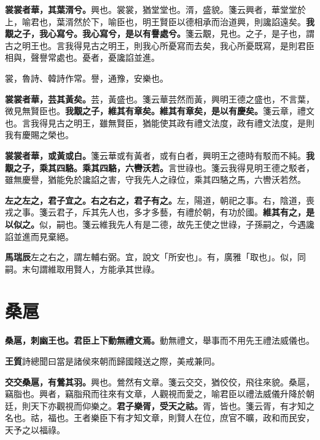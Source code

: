 \textbf{裳裳者華，其葉湑兮。}{\footnotesize 興也。裳裳，猶堂堂也。湑，盛貌。箋云興者，華堂堂於上，喻君也，葉湑然於下，喻臣也，明王賢臣以德相承而治道興，則讒諂遠矣。}\textbf{我覯之子，我心寫兮。我心寫兮，是以有譽處兮。}{\footnotesize 箋云覯，見也。之子，是子也，謂古之明王也。言我得見古之明王，則我心所憂寫而去矣，我心所憂既寫，是則君臣相與，聲譽常處也。憂者，憂讒諂並進。}

\begin{quoting}裳，魯詩、韓詩作常。譽，通豫，安樂也。\end{quoting}

\textbf{裳裳者華，芸其黃矣。}{\footnotesize 芸，黃盛也。箋云華芸然而黃，興明王德之盛也，不言葉，微見無賢臣也。}\textbf{我覯之子，維其有章矣。維其有章矣，是以有慶矣。}{\footnotesize 箋云章，禮文也。言我得見古之明王，雖無賢臣，猶能使其政有禮文法度，政有禮文法度，是則我有慶賜之榮也。}

\textbf{裳裳者華，或黃或白。}{\footnotesize 箋云華或有黃者，或有白者，興明王之德時有駁而不純。}\textbf{我覯之子，乘其四駱。乘其四駱，六轡沃若。}{\footnotesize 言世祿也。箋云我得見明王德之駁者，雖無慶譽，猶能免於讒諂之害，守我先人之祿位，乘其四駱之馬，六轡沃若然。}

\textbf{左之左之，君子宜之。右之右之，君子有之。}{\footnotesize 左，陽道，朝祀之事。右，陰道，喪戎之事。箋云君子，斥其先人也，多才多藝，有禮於朝，有功於國。}\textbf{維其有之，是以似之。}{\footnotesize 似，嗣也。箋云維我先人有是二德，故先王使之世祿，子孫嗣之，今遇讒諂並進而見棄絕。}

\begin{quoting}\textbf{馬瑞辰}左之右之，謂左輔右弼。宜，說文「所安也」。有，廣雅「取也」。似，同嗣。末句謂維取用賢人，方能承其世祿。\end{quoting}

\section{桑扈}


\textbf{桑扈，刺幽王也。君臣上下動無禮文焉。}{\footnotesize 動無禮文，舉事而不用先王禮法威儀也。}

\begin{quoting}\textbf{王質}詩總聞曰當是諸侯來朝而歸國餞送之際，美戒兼同。\end{quoting}

\textbf{交交桑扈，有鶯其羽。}{\footnotesize 興也。鶯然有文章。箋云交交，猶佼佼，飛往來貌。桑扈，竊脂也。興者，竊脂飛而往來有文章，人觀視而愛之，喻君臣以禮法威儀升降於朝廷，則天下亦觀視而仰樂之。}\textbf{君子樂胥，受天之祜。}{\footnotesize 胥，皆也。箋云胥，有才知之名也。祜，福也。王者樂臣下有才知文章，則賢人在位，庶官不曠，政和而民安，天予之以福祿。}

